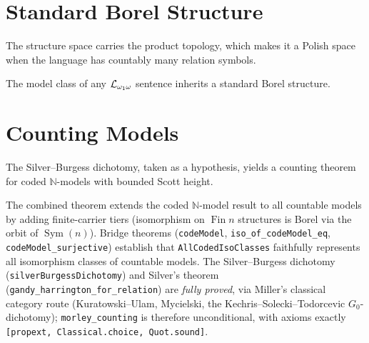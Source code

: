



\section{Standard Borel Structure}

The structure space carries the product topology, which makes it a Polish space
when the language has countably many relation symbols.


The model class of any $\mathcal{L}_{\omega_1\omega}$ sentence inherits a standard Borel structure.



\section{Counting Models}

The Silver--Burgess dichotomy, taken as a hypothesis, yields a counting theorem
for coded $\mathbb{N}$-models with bounded Scott height.









The combined theorem extends the coded $\mathbb{N}$-model result to all countable
models by adding finite-carrier tiers (isomorphism on $\operatorname{Fin} n$
structures is Borel via the orbit of $\operatorname{Sym}(n)$).  Bridge theorems
(\texttt{codeModel}, \texttt{iso\_of\_codeModel\_eq}, \texttt{codeModel\_surjective})
establish that \texttt{AllCodedIsoClasses} faithfully represents all isomorphism
classes of countable models.  The Silver--Burgess dichotomy
(\texttt{silverBurgessDichotomy}) and Silver's theorem
(\texttt{gandy\_harrington\_for\_relation}) are \emph{fully proved}, via
Miller's classical category route (Kuratowski--Ulam, Mycielski, the
Kechris--Solecki--Todorcevic $G_0$-dichotomy); \texttt{morley\_counting} is
therefore unconditional, with axioms exactly
\texttt{[propext, Classical.choice, Quot.sound]}.

